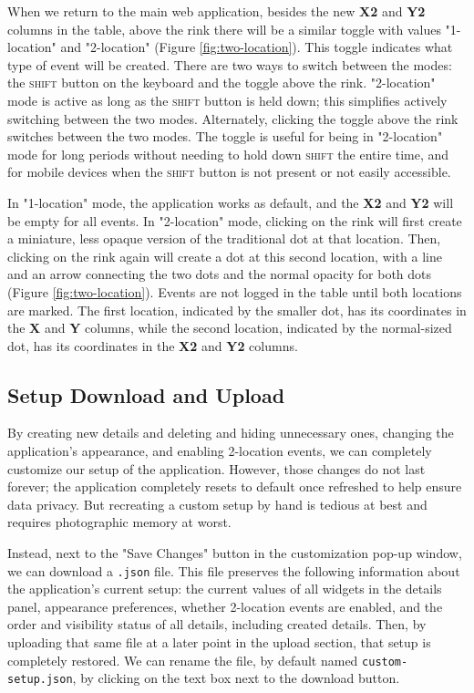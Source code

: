 \documentclass[letterpaper]{article}
\begin{document}
When we return to the main web application, besides the new \textbf{X2} and \textbf{Y2} columns in the table, above the rink there will be a similar toggle with values "1-location" and "2-location" (Figure \ref{fig:two-location}). This toggle indicates what type of event will be created. There are two ways to switch between the modes: the \textsc{shift} button on the keyboard and the toggle above the rink. "2-location" mode is active as long as the \textsc{shift} button is held down; this simplifies actively switching between the two modes. Alternately, clicking the toggle above the rink switches between the two modes. The toggle is useful for being in "2-location" mode for long periods without needing to hold down \textsc{shift} the entire time, and for mobile devices when the \textsc{shift} button is not present or not easily accessible.

In "1-location" mode, the application works as default, and the \textbf{X2} and \textbf{Y2} will be empty for all events. In "2-location" mode, clicking on the rink will first create a miniature, less opaque version of the traditional dot at that location. Then, clicking on the rink again will create a dot at this second location, with a line and an arrow connecting the two dots and the normal opacity for both dots (Figure \ref{fig:two-location}). Events are not logged in the table until both locations are marked. The first location, indicated by the smaller dot, has its coordinates in the  \textbf{X} and \textbf{Y} columns, while the second location, indicated by the normal-sized dot, has its coordinates in the \textbf{X2} and \textbf{Y2} columns.
 
\subsection{Setup Download and Upload} \label{setup-download-upload}
By creating new details and deleting and hiding unnecessary ones, changing the application's appearance, and enabling 2-location events, we can completely customize our setup of the application. However, those changes do not last forever; the application completely resets to default once refreshed to help ensure data privacy. But recreating a custom setup by hand is tedious at best and requires photographic memory at worst. 

Instead, next to the "Save Changes" button in the customization pop-up window, we can download a \texttt{.json} file. This file preserves the following information about the application's current setup: the current values of all widgets in the details panel, appearance preferences, whether 2-location events are enabled, and the order and visibility status of all details, including created details. Then, by uploading that same file at a later point in the upload section, that setup is completely restored. We can rename the file, by default named \texttt{custom-setup.json}, by clicking on the text box next to the download button.
\end{document}
